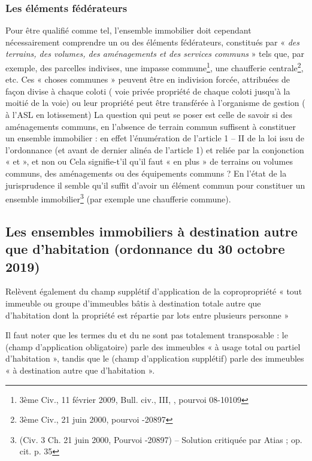 		\subsubsection{Les éléments fédérateurs}
			Pour être qualifié comme tel, l’ensemble immobilier doit cependant nécessairement comprendre un ou
			des éléments fédérateurs, constitués par « \emph{des terrains, des volumes, des aménagements et des services communs} » tels que, par exemple, des parcelles indivises, une impasse commune\footnote{3ème Civ., 11 février 2009, Bull. civ., III, , pourvoi 08-10109}, une chaufferie
			centrale\footnote{3ème Civ., 21 juin 2000, pourvoi -20897}, etc.
			Ces « choses communes » peuvent être en indivision forcée, attribuées de façon divise à chaque coloti (
			voie privée propriété de chaque coloti jusqu’à la moitié de la voie) ou leur propriété peut être transférée
			à l’organisme de gestion ( à l’ASL en lotissement)
			La question qui peut se poser est celle de savoir si des aménagements communs, en l’absence de terrain
			commun suffisent à constituer un ensemble immobilier : en effet l’énumération de l’article 1 – II de la loi
			issu de l’ordonnance (et avant de dernier alinéa de l’article 1) et reliée par la conjonction « et », et non ou
			Cela signifie-t’il qu’il faut « en plus » de terrains ou volumes communs, des aménagements ou des
			équipements communs ? En l’état de la jurisprudence il semble qu’il suffit d’avoir un élément commun
			pour constituer un ensemble immobilier\footnote{
			(Civ. 3\degre{} Ch. 21 juin 2000, Pourvoi -20897) – Solution critiquée par Atias ; op. cit. p. 35
			}	(par exemple une chaufferie commune).
	
	\subsection{Les ensembles immobiliers à destination autre que d’habitation (ordonnance du 30 octobre 2019)}
		Relèvent également du champ supplétif d’application de la copropropriété « tout immeuble ou groupe
		d’immeubles bâtis à destination totale autre que d’habitation dont la propriété est répartie par lots entre
		plusieurs personne »
		
		Il faut noter que les termes du \I{} et du \II{} ne sont pas totalement transposable : le \I{} (champ d’application
		obligatoire) parle des immeubles « à usage total ou partiel d’habitation », tandis que le \II{} (champ
		d’application supplétif) parle des immeubles « à destination autre que d’habitation ».
		
